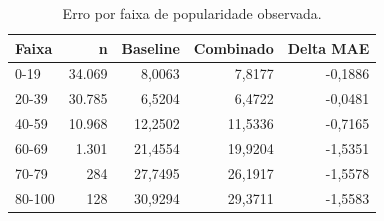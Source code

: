 \begin{table}[!htbp]\centering\small
\caption{Erro por faixa de popularidade observada.}
\begin{tabularx}{\linewidth}{Xrrrr}
\toprule
Faixa & n & Baseline & Combinado & Delta MAE \\
\midrule
0-19 & 34.069 & 8,0063 & 7,8177 & -0,1886 \\
20-39 & 30.785 & 6,5204 & 6,4722 & -0,0481 \\
40-59 & 10.968 & 12,2502 & 11,5336 & -0,7165 \\
60-69 & 1.301 & 21,4554 & 19,9204 & -1,5351 \\
70-79 & 284 & 27,7495 & 26,1917 & -1,5578 \\
80-100 & 128 & 30,9294 & 29,3711 & -1,5583 \\
\bottomrule\end{tabularx}
\par{}
\end{table}

